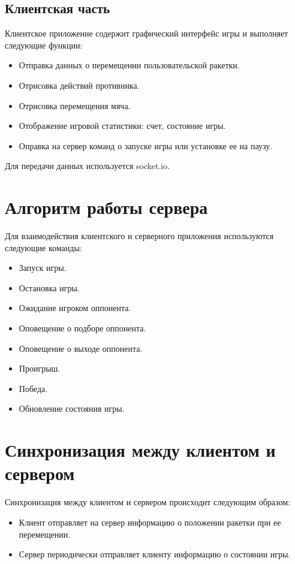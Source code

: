 \subsection{Клиентская часть}

Клиентское приложение содержит графический интерфейс игры и выполняет следующие функции:

\begin{itemize}
	\item Отправка данных о перемещении пользовательской ракетки.
	\item Отрисовка действий противника.
	\item Отрисовка перемещения мяча.
	\item Отображение игровой статистики: счет, состояние игры.
	\item Оправка на сервер команд о запуске игры или установке ее на паузу.
\end{itemize}

Для передачи данных используется socket.io.

\section{Алгоритм работы сервера}
Для взаимодействия клиентского и серверного приложения используются следующие команды:

\begin{itemize}
	\item Запуск игры.
	\item Остановка игры.
	\item Ожидание игроком оппонента.
	\item Оповещение о подборе оппонента.
	\item Оповещение о выходе оппонента.
	\item Проигрыш.
	\item Победа.
	\item Обновление состояния игры.
\end{itemize}

\section{Синхронизация между клиентом и сервером}

Синхронизация между клиентом и сервером происходит следующим образом:

\begin{itemize}
	\item Клиент отправляет на сервер информацию о положении ракетки при ее перемещении.
	\item Сервер периодически отправляет клиенту информацию о состоянии игры.
\end{itemize}

